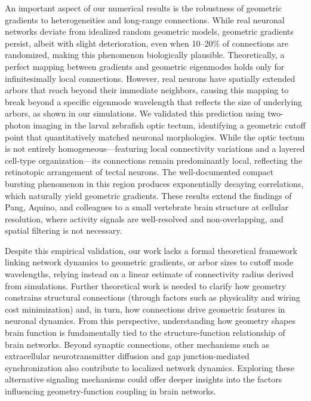 \documentclass{article}
\begin{document}
An important aspect of our numerical results is the robustness of geometric gradients to heterogeneities and long-range connections. While real neuronal networks deviate from idealized random geometric models, geometric gradients persist, albeit with slight deterioration, even when 10–20\% of connections are randomized, making this phenomenon biologically plausible. Theoretically, a perfect mapping between gradients and geometric eigenmodes holds only for infinitesimally local connections. However, real neurons have spatially extended arbors that reach beyond their immediate neighbors, causing this mapping to break beyond a specific eigenmode wavelength that reflects the size of underlying arbors, as shown in our simulations. We validated this prediction using two-photon imaging in the larval zebrafish optic tectum, identifying a geometric cutoff point that quantitatively matched neuronal morphologies. While the optic tectum is not entirely homogeneous---featuring local connectivity variations and a layered cell-type organization---its connections remain predominantly local, reflecting the retinotopic arrangement of tectal neurons. The well-documented compact bursting phenomenon in this region produces exponentially decaying correlations, which naturally yield geometric gradients. These results extend the findings of Pang, Aquino, and colleagues to a small vertebrate brain structure at cellular resolution, where activity signals are well-resolved and non-overlapping, and spatial filtering is not necessary.

Despite this empirical validation, our work lacks a formal theoretical framework linking network dynamics to geometric gradients, or arbor sizes to cutoff mode wavelengths, relying instead on a linear estimate of connectivity radius derived from simulations. Further theoretical work is needed to clarify how geometry constrains structural connections (through factors such as physicality and wiring cost minimization) and, in turn, how connections drive geometric features in neuronal dynamics. From this perspective, understanding how geometry shapes brain function is fundamentally tied to the structure-function relationship of brain networks. Beyond synaptic connections, other mechanisms such as extracellular neurotransmitter diffusion and gap junction-mediated synchronization also contribute to localized network dynamics. Exploring these alternative signaling mechanisms could offer deeper insights into the factors influencing geometry-function coupling in brain networks.
\end{document}
